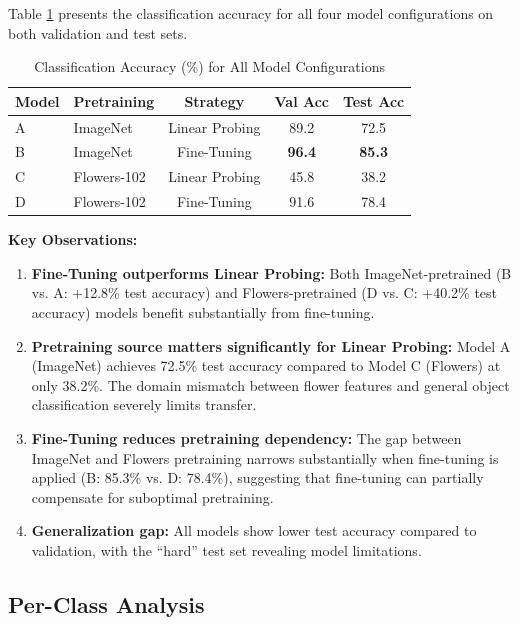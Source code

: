 \documentclass[11pt,a4paper]{article}
\begin{document}
Table \ref{tab:results} presents the classification accuracy for all four model configurations on both validation and test sets.

\begin{table}[H]
\centering
\caption{Classification Accuracy (\%) for All Model Configurations}
\label{tab:results}
\begin{tabular}{llccc}
\toprule
\textbf{Model} & \textbf{Pretraining} & \textbf{Strategy} & \textbf{Val Acc} & \textbf{Test Acc} \\
\midrule
A & ImageNet & Linear Probing & 89.2 & 72.5 \\
B & ImageNet & Fine-Tuning & \textbf{96.4} & \textbf{85.3} \\
C & Flowers-102 & Linear Probing & 45.8 & 38.2 \\
D & Flowers-102 & Fine-Tuning & 91.6 & 78.4 \\
\bottomrule
\end{tabular}
\end{table}

\textbf{Key Observations:}

\begin{enumerate}
    \item \textbf{Fine-Tuning outperforms Linear Probing:} Both ImageNet-pretrained (B vs. A: +12.8\% test accuracy) and Flowers-pretrained (D vs. C: +40.2\% test accuracy) models benefit substantially from fine-tuning.

    \item \textbf{Pretraining source matters significantly for Linear Probing:} Model A (ImageNet) achieves 72.5\% test accuracy compared to Model C (Flowers) at only 38.2\%. The domain mismatch between flower features and general object classification severely limits transfer.

    \item \textbf{Fine-Tuning reduces pretraining dependency:} The gap between ImageNet and Flowers pretraining narrows substantially when fine-tuning is applied (B: 85.3\% vs. D: 78.4\%), suggesting that fine-tuning can partially compensate for suboptimal pretraining.

    \item \textbf{Generalization gap:} All models show lower test accuracy compared to validation, with the ``hard'' test set revealing model limitations.
\end{enumerate}

\subsection{Per-Class Analysis}
\end{document}
